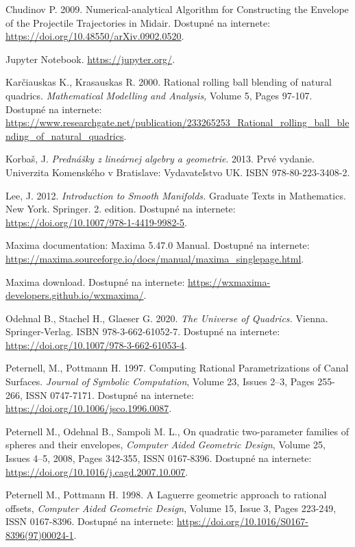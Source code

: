 \documentclass[12pt, twoside]{book}
\theoremstyle{definition}
\begin{document}
\begin{thebibliography}{99}
 Chudinov P. 2009. Numerical-analytical Algorithm for Constructing the Envelope of the Projectile Trajectories in Midair. Dostupné na internete: \url{https://doi.org/10.48550/arXiv.0902.0520}.

 Jupyter Notebook. \url{https://jupyter.org/}.

 Karčiauskas K., Krasauskas R. 2000. Rational rolling ball blending of natural quadrics. \textit{Mathematical Modelling and Analysis,} Volume 5, Pages 97-107. Dostupné na internete: \url{https://www.researchgate.net/publication/233265253_Rational_rolling_ball_blending_of_natural_quadrics}.

 Korbaš, J. \textit{Prednášky z lineárnej algebry a geometrie}. 2013. Prvé vydanie. Univerzita Komenského v Bratislave: Vydavateľstvo UK.  ISBN 978-80-223-3408-2.

 Lee, J. 2012. \textit{Introduction to Smooth Manifolds.} Graduate Texts in Mathematics. New York. Springer. 2. edition. Dostupné na internete: \url{https://doi.org/10.1007/978-1-4419-9982-5}.

 Maxima documentation: Maxima 5.47.0 Manual. Dostupné na internete: \url{https://maxima.sourceforge.io/docs/manual/maxima_singlepage.html}.

 Maxima download. Dostupné na internete: \url{https://wxmaxima-developers.github.io/wxmaxima/}.

 Odehnal B., Stachel H., Glaeser G. 2020. \textit{The Universe of Quadrics.} Vienna. Springer-Verlag. ISBN 978-3-662-61052-7. Dostupné na internete: \url{https://doi.org/10.1007/978-3-662-61053-4}.

 Peternell, M., Pottmann H. 1997. Computing Rational Parametrizations of Canal Surfaces. \textit{Journal of Symbolic Computation}, Volume 23, Issues 2–3, Pages 255-266, ISSN 0747-7171. Dostupné na internete: \url{https://doi.org/10.1006/jsco.1996.0087}.

 Peternell M., Odehnal B., Sampoli M. L.,
On quadratic two-parameter families of spheres and their envelopes, \textit{Computer Aided Geometric Design}, Volume 25, Issues 4–5, 2008, Pages 342-355, ISSN 0167-8396. Dostupné na internete: \url{https://doi.org/10.1016/j.cagd.2007.10.007}.

 Peternell M., Pottmann H. 1998. A Laguerre geometric approach to rational offsets, \textit{Computer Aided Geometric Design},
Volume 15, Issue 3, Pages 223-249, ISSN 0167-8396. Dostupné na internete: \url{https://doi.org/10.1016/S0167-8396(97)00024-1}.


\end{thebibliography}
\end{document}
